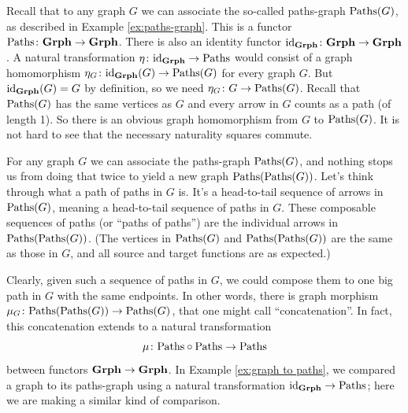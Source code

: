 \documentclass[CT4S-EN-RU]{subfiles}
\begin{document}
\begin{exampleRUS}
\end{exampleRUS}

\begin{exampleENG}\label{ex:graph to paths}
Recall that to any graph $G$ we can associate the so-called paths-graph $\textnormal{Paths}(G)$, as described in Example \ref{ex:paths-graph}. This is a functor $\textnormal{Paths}\colon{\bf Grph}\rightarrow{\bf Grph}$. There is also an identity functor $\textnormal{id}_{{\bf Grph}}\colon{\bf Grph}\rightarrow{\bf Grph}$. A natural transformation $\eta\colon\textnormal{id}_{\bf Grph}\rightarrow\textnormal{Paths}$ would consist of a graph homomorphism $\eta_G\colon \textnormal{id}_{\bf Grph}(G)\rightarrow\textnormal{Paths}(G)$ for every graph $G$. But $\textnormal{id}_{\bf Grph}(G)=G$ by definition, so we need $\eta_G\colon G\rightarrow\textnormal{Paths}(G)$. Recall that $\textnormal{Paths}(G)$ has the same vertices as $G$ and every arrow in $G$ counts as a path (of length 1). So there is an obvious graph homomorphism from $G$ to $\textnormal{Paths}(G)$. It is not hard to see that the necessary naturality squares commute.
\end{exampleENG}

\begin{exampleRUS}\label{ex:graph to paths}
\end{exampleRUS}

\begin{exampleENG}\label{ex:concat paths of paths}
For any graph $G$ we can associate the paths-graph $\textnormal{Paths}(G)$, and nothing stops us from doing that twice to yield a new graph $\textnormal{Paths}(\textnormal{Paths}(G))$. Let's think through what a path of paths in $G$ is. It's a head-to-tail sequence of arrows in $\textnormal{Paths}(G)$, meaning a head-to-tail sequence of paths in $G$. These composable sequences of paths (or “paths of paths”) are the individual arrows in $\textnormal{Paths}(\textnormal{Paths}(G))$. (The vertices in $\textnormal{Paths}(G)$ and $\textnormal{Paths}(\textnormal{Paths}(G))$ are the same as those in $G$, and all source and target functions are as expected.)

Clearly, given such a sequence of paths in $G$, we could compose them to one big path in $G$ with the same endpoints. In other words, there is graph morphism $\mu_G\colon\textnormal{Paths}(\textnormal{Paths}(G))\rightarrow\textnormal{Paths}(G)$, that one might call “concatenation”. In fact, this concatenation extends to a natural transformation $$\mu\colon\textnormal{Paths}\circ\textnormal{Paths}\rightarrow\textnormal{Paths}$$ between functors ${\bf Grph}\rightarrow{\bf Grph}$. In Example \ref{ex:graph to paths}, we compared a graph to its paths-graph using a natural transformation $\textnormal{id}_{{\bf Grph}}\rightarrow\textnormal{Paths}$; here we are making a similar kind of comparison.
\end{exampleENG}
\end{document}
